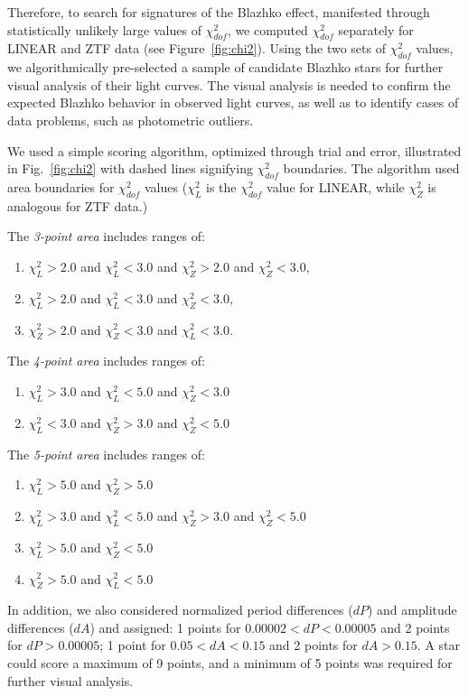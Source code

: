 Therefore, to search for signatures of the Blazhko effect, manifested through statistically unlikely large values
of $\chi^2_{dof}$, we computed $\chi^2_{dof}$ separately for LINEAR and ZTF data (see Figure~\ref{fig:chi2}). 
Using the two sets of $\chi^2_{dof}$ values, we algorithmically pre-selected a sample of candidate Blazhko stars
for further visual analysis of their light curves. The visual analysis is needed to confirm the expected Blazhko behavior
in observed light curves, as well as to identify cases of data problems, such as photometric outliers. 

We used a simple scoring algorithm, optimized through trial and error, illustrated in Fig.~\ref{fig:chi2} with dashed lines signifying $\chi^2_{dof}$ boundaries.
The algorithm used area boundaries for $\chi^2_{dof}$ values ($\chi^2_L$ is the $\chi^2_{dof}$ value for LINEAR, while $\chi^2_Z$ is analogous for ZTF data.)

The \textit{3-point area} includes ranges of:
\begin{enumerate}
    \item $\chi^2_L > 2.0$ and $\chi^2_L < 3.0$ and $\chi^2_Z > 2.0$ and $\chi^2_Z < 3.0$,
    \item $\chi^2_L > 2.0$ and $\chi^2_L < 3.0$ and $\chi^2_Z < 3.0$,
    \item $\chi^2_Z > 2.0$ and $\chi^2_Z < 3.0$ and $\chi^2_L <3.0$.
\end{enumerate}

The \textit{4-point area} includes ranges of:

\begin{enumerate}
\item $\chi^2_L > 3.0$ and $\chi^2_L < 5.0$ and $\chi^2_Z < 3.0$
\item $\chi^2_L < 3.0$ and $\chi^2_Z > 3.0$ and $\chi^2_Z < 5.0$
\end{enumerate}
    
The \textit{5-point area} includes ranges of:

\begin{enumerate}
\item $\chi^2_L > 5.0$ and $\chi^2_Z > 5.0$
\item $\chi^2_L > 3.0$ and $\chi^2_L < 5.0$ and $\chi^2_Z > 3.0$ and $\chi^2_Z < 5.0$
\item $\chi^2_L > 5.0$ and $\chi^2_Z < 5.0$
\item $\chi^2_Z > 5.0$ and $\chi^2_L < 5.0$
\end{enumerate}

In addition, we also considered normalized period differences ($dP$) and amplitude differences ($dA$) and assigned: 1 points for $0.00002 < dP < 0.00005$
and 2 points for $dP > 0.00005$; 1 point for $0.05 < dA < 0.15$ and 2 points for $dA > 0.15$. 
A star could score a maximum of 9 points, and a minimum of 5 points was required for further visual analysis. 

